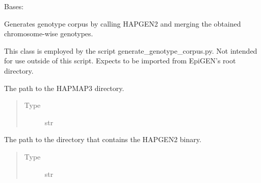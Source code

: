 \documentclass[a4paper,10pt,english]{sphinxhowto}
\begin{document}
\begin{fulllineitems}
\label{\detokenize{utils:utils.genotype_corpus_generator.GenotypeCorpusGenerator}}
Bases: 

Generates genotype corpus by calling HAPGEN2 and merging the obtained chromosome-wise genotypes.

This class is employed by the script generate\_genotype\_corpus.py.
Not intended for use outside of this script.
Expects to be imported from EpiGEN’s root directory.

\begin{fulllineitems}
\label{\detokenize{utils:utils.genotype_corpus_generator.GenotypeCorpusGenerator.hapmap_dir}}
The path to the HAPMAP3 directory.
\begin{quote}\begin{description}
\item[{Type}] \leavevmode
str

\end{description}\end{quote}

\end{fulllineitems}


\begin{fulllineitems}
\label{\detokenize{utils:utils.genotype_corpus_generator.GenotypeCorpusGenerator.hapgen_dir}}
The path to the directory that contains the HAPGEN2 binary.
\begin{quote}\begin{description}
\item[{Type}] \leavevmode
str

\end{description}\end{quote}


\end{fulllineitems}
\end{fulllineitems}
\end{document}
